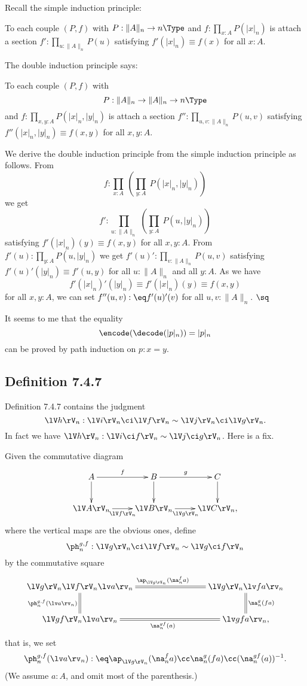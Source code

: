 \documentclass[12pt]{article}
\begin{document}
Recall the simple induction principle:

To each couple $(P,f)$ with $P:\lVert A\rVert_n\to n\Type$ and $f:\prod_{x:A}P(\lvert x\rvert_n)$ is attach a section $f':\prod_{u:\lVert A\rVert_n}P(u)$ satisfying $f'(\lvert x\rvert_n)\equiv f(x)$ for all $x:A$.

The double induction principle says:

To each couple $(P,f)$ with $$P:\lVert A\rVert_n\to\lVert A\rVert_n\to n\Type$$ and $f:\prod_{x,y:A}P(\lvert x\rvert_n,\lvert y\rvert_n)$ is attach a section $f'':\prod_{u,v:\lVert A\rVert_n}P(u,v)$ satisfying $f''(\lvert x\rvert_n,\lvert y\rvert_n)\equiv f(x,y)$ for all $x,y:A$.

We derive the double induction principle from the simple induction principle as follows. From 
$$
f:\prod_{x:A}\ \left(\prod_{y:A}\ P(\lvert x\rvert_n,\lvert y\rvert_n)\right)
$$ 
we get 
$$
f':\prod_{u:\lVert A\rVert_n}\ \left(\prod_{y:A}\ P(u,\lvert y\rvert_n)\right)
$$ 
satisfying $f'(\lvert x\rvert_n)(y)\equiv f(x,y)$ for all $x,y:A$. From $f'(u):\prod_{y:A}P(u,\lvert y\rvert_n)$ we get $f'(u)':\prod_{v:\lVert A\rVert_n}P(u,v)$ satisfying $f'(u)'(\lvert y\rvert_n)\equiv f'(u,y)$ for all $u:\lVert A\rVert_n$ and all $y:A$. As we have 
$$
f'(\lvert x\rvert_n)'(\lvert y\rvert_n)\equiv f'(\lvert x\rvert_n)(y)\equiv f(x,y) 
$$ 
for all $x,y:A$, we can set $f''(u,v):\eq f'(u)'(v)$ for all $u,v:\lVert A\rVert_n$. $\sq$

It seems to me that the equality 
$$
\encode(\decode(\lvert p\rvert_n))=\lvert p\rvert_n
$$ 
can be proved by path induction on $p:x=y$.


\subsection{Definition 7.4.7}\label{747}

Definition 7.4.7 contains the judgment 
$$
\lV h\rV_n:\lV i\rV_n\ci\lV f\rV_n\sim\lV j\rV_n\ci\lV g\rV_n.
$$ 
In fact we have $\lV h\rV_n:\lV i\ci f\rV_n\sim\lV j\ci g\rV_n$. Here is a fix. 

Given the commutative diagram
$$
\xymatrix{
A\ar[r]^f\ar[d]&B\ar[r]^g\ar[d]&C\ar[d]\\
\lV A\rV_n\ar[r]_{\lV f\rV_n}&\lV B\rV_n\ar[r]_{\lV g\rV_n}&\lV C\rV_n,}
$$ 
where the vertical maps are the obvious ones, define 
$$
\ph_n^{g,f}:\lV g\rV_n\ci\lV f\rV_n\sim\lV g\ci f\rV_n
$$ 
by the commutative square 
$$
\xymatrix{
\lV g\rV_n\lV f\rV_n\lv a\rv_n\ar@{=}[d]_{\ph_n^{g,f}(\lv a\rv_n)}\ar@{=}[rrr]^{\ap_{\lV g\rV_n}(\na_n^fa)}&&&
\lV g\rV_n\lv fa\rv_n\ar@{=}[d]^{\na_n^g(fa)}\\
\lV gf\rV_n\lv a\rv_n\ar@{=}[rrr]_{\na_n^{gf}(a)}&&&\lv gfa\rv_n,}
$$ 
that is, we set 
$$
\ph_n^{g,f}(\lv a\rv_n):\eq\ap_{\lV g\rV_n}(\na_n^fa)\cc\na_n^g(fa)\cc(\na_n^{gf}(a))^{-1}.
$$ 
(We assume $a:A$, and omit most of the parenthesis.)
\end{document}
